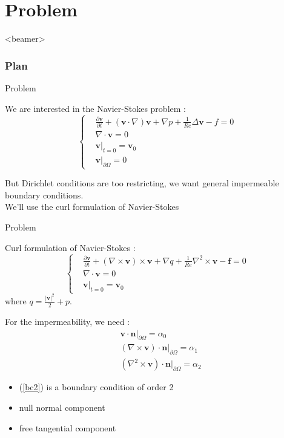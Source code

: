 \documentclass{beamer}
\newcommand{\grad}{{\nabla}}
\newcommand{\laplace}{{\Delta}}
\newcommand{\curl}{{\nabla\times}}
\newcommand{\curll}{{\nabla^2\times}}
\renewcommand{\div}{{\nabla\cdot}}
\newcommand{\restr}{{\big\rvert_{\partial\Omega}}}
\begin{document}
\section{Problem}
\begin{frame}<beamer>
  \frametitle{Plan}
  \tableofcontents[currentsection]
\end{frame}
  
\begin{frame}{Problem}
  \begin{block}{We are interested in the Navier-Stokes problem :}
    \[ \left\{
    \begin{aligned}
      &\frac{\partial\mathbf{v}}{\partial t} + (\mathbf{v}\cdot\grad)\mathbf{v} + \grad p + \frac{1}{Re}\laplace\mathbf{v} -f = 0\\
      &\div\mathbf{v} = 0\\
      &\mathbf{v}\big\rvert_{t=0} = \mathbf{v}_0\\
      &\mathbf{v}\restr = 0
    \end{aligned}
    \right.\]
    \end{block}
  But Dirichlet conditions are too restricting, we want general impermeable boundary conditions.\\
  We'll use the curl formulation of Navier-Stokes
\end{frame}

\begin{frame}{Problem}
  \begin{block}{Curl formulation of Navier-Stokes :}
    \begin{equation}
      \label{start}
      \left\{\begin{aligned}
      &\frac{\partial \mathbf{v}}{\partial t} + (\curl  \mathbf{v})\times \mathbf{v} + \grad q + \frac{1}{Re}\curll  \mathbf{v}-\mathbf{f} = 0\\
      &\div \mathbf{v} = 0\\
      &\mathbf{v}\big\rvert_{t=0} = \mathbf{v}_0
      \end{aligned}\right.
    \end{equation}
    where $q = \frac{|\mathbf{v}|^2}{2}+p$.
  \end{block}
  For the impermeability, we need :
  \begin{align}
    &\mathbf{v}\cdot \mathbf{n}\restr = \alpha_0 \label{bc0}\\
    &(\curl  \mathbf{v})\cdot \mathbf{n}\restr = \alpha_1 \label{bc1}\\
    &(\curll  \mathbf{v})\cdot \mathbf{n}\restr = \alpha_2 \label{bc2}
  \end{align}
  \begin{itemize}
  \item (\ref{bc2}) is a boundary condition of order 2
  \item null normal component
  \item free tangential component
  \end{itemize}
\end{frame}
\end{document}
